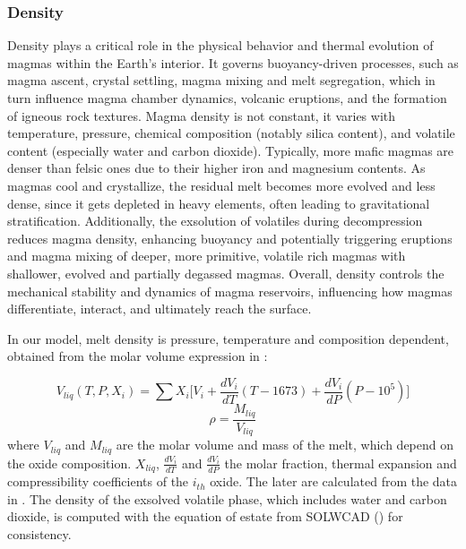 \subsubsection{Density}
Density plays a critical role in the physical behavior and thermal evolution of magmas within the Earth's interior. It governs buoyancy-driven processes, such as magma ascent, crystal settling, magma mixing and melt segregation, which in turn influence magma chamber dynamics, volcanic eruptions, and the formation of igneous rock textures. Magma density is not constant, it varies with temperature, pressure, chemical composition (notably silica content), and volatile content (especially water and carbon dioxide). Typically, more mafic magmas are denser than felsic ones due to their higher iron and magnesium contents. As magmas cool and crystallize, the residual melt becomes more evolved and less dense, since it gets depleted in heavy elements, often leading to gravitational stratification. Additionally, the exsolution of volatiles during decompression reduces magma density, enhancing buoyancy and potentially triggering eruptions and magma mixing of deeper, more primitive, volatile rich magmas with shallower, evolved and partially degassed magmas. Overall, density controls the mechanical stability and dynamics of magma reservoirs, influencing how magmas differentiate, interact, and ultimately reach the surface.

In our model, melt density is pressure, temperature and composition dependent, obtained from the molar volume expression in \cite{lange1990}:

\begin{equation}
	V_{liq}(T,P,X_i) = \sum X_i \bigg[V_i + \frac{dV_i}{dT} (T-1673) + \frac{dV_i}{dP}(P-10^5)\bigg]
\end{equation}
\begin{equation}
	\rho = \frac{M_{liq}}{V_{liq}}
\end{equation}
where $V_{liq}$ and $M_{liq}$ are the molar volume and mass of the melt, which depend on the oxide composition. $X_{liq}$, $\frac{dV_i}{dT}$ and $ \frac{dV_i}{dP}$ the molar fraction, thermal expansion and compressibility coefficients of the $i_{th}$ oxide. The later are calculated from the data in \cite{lesher2015}.
The density of the exsolved volatile phase, which includes water and carbon dioxide, is computed with the equation of estate from SOLWCAD (\cite{papale2006}) for consistency.

